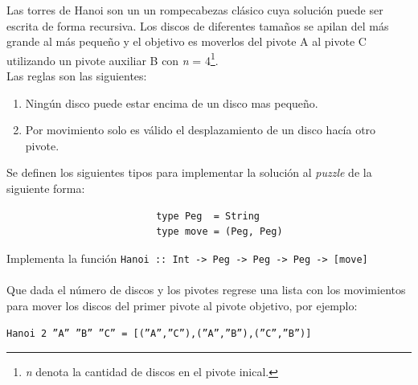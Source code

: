     \begin{exercise}
        Las torres de Hanoi son un un rompecabezas clásico cuya solución puede ser escrita de forma recursiva. Los discos de diferentes tamaños se apilan del más grande al más pequeño y el objetivo es moverlos del pivote A al pivote C utilizando un pivote auxiliar B con \textit{n} = 4\footnote{\textit{n} denota la cantidad de discos en el pivote inical.}.\\
        
        Las reglas son  las siguientes: \\
        
        \begin{enumerate}
            \item Ningún disco puede estar encima de un disco mas pequeño. 
            \item Por movimiento solo es válido el desplazamiento de un disco hacía otro pivote.
        \end{enumerate}

        Se definen los siguientes tipos para implementar la solución al \textit{puzzle} de la siguiente forma: 

        \begin{center}
            \begin{verbatim}
                          type Peg  = String
                          type move = (Peg, Peg)
            \end{verbatim}
        \end{center}
        

        Implementa la función \texttt{Hanoi :: Int ->\ Peg ->\ Peg ->\ Peg ->\ [move]}\\\\
        Que dada el número de discos y los pivotes regrese una lista con los movimientos para mover los discos del primer pivote al pivote objetivo, por ejemplo: \\
        \begin{center}
            \texttt{Hanoi 2  ''A'' ''B'' ''C'' = [(''A'',''C''),(''A'',''B''),(''C'',''B'')]}
        \end{center}
    \end{exercise}  

    \newpage

